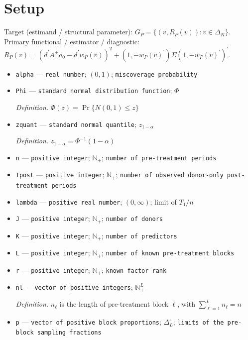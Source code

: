 \documentclass{article}
\begin{document}
\section{Setup}

Target (estimand / structural parameter): \(G_P=\{(v,R_P(v)):v\in\Delta_K\}\).
Primary functional / estimator / diagnostic: \(R_P(v)=(d^{\prime}A^+a_0-d^{\prime}w_P(v))^2+(1,-w_P(v)^{\prime})\Sigma(1,-w_P(v)^{\prime})^{\prime}\).
\begin{itemize}
  \item \texttt{alpha} --- \texttt{real number}; \((0,1)\); \texttt{miscoverage probability}
  \item \texttt{Phi} --- \texttt{standard normal distribution function}; \(\Phi\)
  \par\smallskip\noindent\emph{Definition.} \(\Phi(z)=\Pr\{N(0,1)\le z\}\)
  \item \texttt{zquant} --- \texttt{standard normal quantile}; \(z_{1-\alpha}\)
  \par\smallskip\noindent\emph{Definition.} \(z_{1-\alpha}=\Phi^{-1}(1-\alpha)\)
  \item \texttt{n} --- \texttt{positive integer}; \(\mathbb N_{+}\); \texttt{number of pre-\allowbreak{}treatment periods}
  \item \texttt{Tpost} --- \texttt{positive integer}; \(\mathbb N_{+}\); \texttt{number of observed donor-\allowbreak{}only post-\allowbreak{}treatment periods}
  \item \texttt{lambda} --- \texttt{positive real number}; \((0,\infty)\); limit of \(T_1/n\)
  \item \texttt{J} --- \texttt{positive integer}; \(\mathbb N_{+}\); \texttt{number of donors}
  \item \texttt{K} --- \texttt{positive integer}; \(\mathbb N_{+}\); \texttt{number of predictors}
  \item \texttt{L} --- \texttt{positive integer}; \(\mathbb N_{+}\); \texttt{number of known pre-\allowbreak{}treatment blocks}
  \item \texttt{r} --- \texttt{positive integer}; \(\mathbb N_{+}\); \texttt{known factor rank}
  \item \texttt{nl} --- \texttt{vector of positive integers}; \(\mathbb N_{+}^{L}\)
  \par\smallskip\noindent\emph{Definition.} \(n_\ell\) is the length of pre-treatment block \(\ell\), with \(\sum_{\ell=1}^{L}n_\ell=n\)
  \item \texttt{p} --- \texttt{vector of positive block proportions}; \(\Delta_L^{\circ}\); \texttt{limits of the pre-\allowbreak{}block sampling fractions}

\end{itemize}
\end{document}
